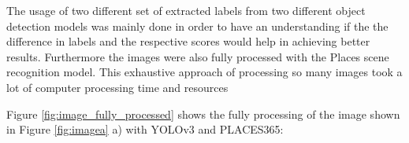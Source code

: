     The usage of two different set of extracted labels from two different object detection models was mainly done in order to have an understanding if the the difference in labels and the respective scores would help in achieving better results. Furthermore the images were also fully processed with the Places scene recognition model. This exhaustive approach of processing so many images took a lot of computer processing time and resources


    Figure \ref{fig:image_fully_processed} shows the fully processing of the image shown in Figure \ref{fig:imagea} a) with YOLOv3 and PLACES365:
    
    \begin{figure}[H]
      \centering
      \captionsetup{justification=centering}
  
      \begin{subfigure}{0.365\textwidth}
      

\end{subfigure}
\end{figure}
